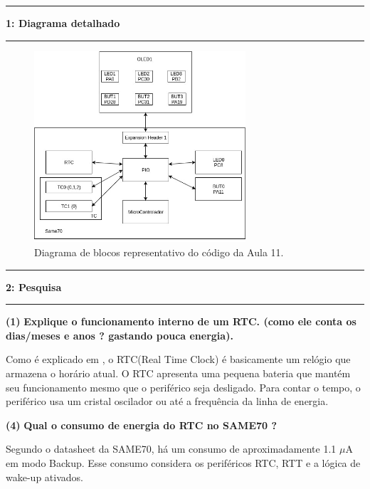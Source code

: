 \documentclass[11pt]{article}
\newcommand\question[2]{\vspace{.25in}\hrule\textbf{#1: #2}\vspace{.5em}\hrule\vspace{.10in}}
\newcommand\funcionamentortc{\vspace{.10in}\textbf{Explique o funcionamento interno de um RTC. (como ele conta os dias/meses e anos ? gastando pouca energia).}}
\newcommand\consumortc{\vspace{.10in}\textbf{Qual o consumo de energia do RTC no SAME70 ?}}
\renewcommand\part[1]{\vspace{.10in}\textbf{(#1)}}
\begin{document}
\raggedright
\newcommand\NAME{Marcelo G de Andrade}  %
\newcommand\HWNUM{1}              %


\raggedright
\question{1}{Diagrama detalhado}

\begin{figure}[h!]
	\centering
	\includegraphics[width=0.7\textwidth]{tictack.jpg}
	\caption{Diagrama de blocos representativo do código da Aula 11.}
\end{figure}


\raggedright
\question{2}{Pesquisa}

\part{1} \funcionamentortc

\RaggedRight
Como é explicado em \cite{rtc}, o RTC(Real Time Clock) é basicamente um relógio que armazena o horário atual. O RTC apresenta uma pequena bateria que mantém seu funcionamento mesmo que o periférico seja desligado. Para contar o tempo, o periférico usa um cristal oscilador ou até a frequência da linha de energia.

\part{4} \consumortc

\RaggedRight
Segundo o datasheet da SAME70, há um consumo de aproximadamente 1.1 \(\mu\)A em modo Backup. Esse consumo considera os periféricos RTC, RTT e a lógica de wake-up ativados.


{}

\end{document}

